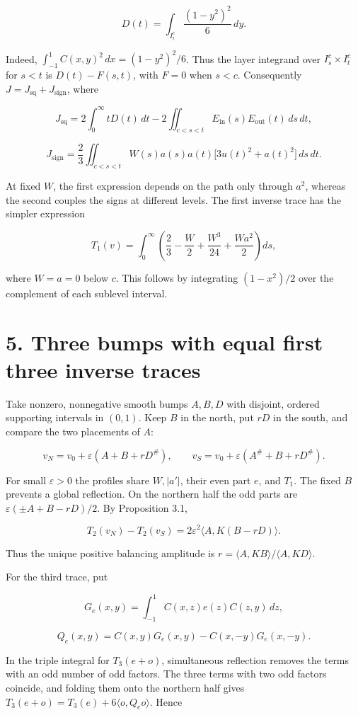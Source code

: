 \documentclass[11pt,letterpaper]{article}
\begin{document}
\[D(t)=\int_{I_t^c}\frac{(1-y^2)^2}{6}\,dy.\]

Indeed, \(\int_{-1}^1 C(x,y)^2\,dx=(1-y^2)^2/6\). Thus the layer integrand over
\(I_s^c\times I_t^c\) for \(s<t\) is \(D(t)-F(s,t)\), with \(F=0\) when \(s<c\).
Consequently \(J=J_{\mathrm{sq}}+J_{\mathrm{sign}}\), where

\[J_{\mathrm{sq}}=2\int_0^\infty tD(t)\,dt-2\iint_{c<s<t}E_{\mathrm{in}}(s)E_{\mathrm{out}}(t)\,ds\,dt,\]

\[J_{\mathrm{sign}}=\frac{2}{3}\iint_{c<s<t}W(s)a(s)a(t)\bigl[3u(t)^2+a(t)^2\bigr]\,ds\,dt.\]

At fixed \(W\), the first expression depends on the path only through \(a^2\), whereas the
second couples the signs at different levels. The first inverse trace has the simpler
expression

\[T_1(v)=\int_0^\infty\left(\frac23-\frac W2+\frac{W^3}{24}+\frac{Wa^2}{2}\right)ds,\]

where \(W=a=0\) below \(c\). This follows by integrating \((1-x^2)/2\) over the complement
of each sublevel interval.

\section{5. Three bumps with equal first three inverse
traces}\label{three-bumps-with-equal-first-three-inverse-traces}

Take nonzero, nonnegative smooth bumps \(A,B,D\) with disjoint, ordered supporting intervals
in \((0,1)\). Keep \(B\) in the north, put \(rD\) in the south, and compare the two
placements of \(A\):

\[v_N=v_0+\varepsilon(A+B+rD^\#),\qquad v_S=v_0+\varepsilon(A^\#+B+rD^\#).\]

For small \(\varepsilon>0\) the profiles share \(W,|a'|\), their even part \(e\), and
\(T_1\). The fixed \(B\) prevents a global reflection. On the northern half the odd parts
are \(\varepsilon(\pm A+B-rD)/2\). By Proposition 3.1,

\[T_2(v_N)-T_2(v_S)=2\varepsilon^2\langle A,K(B-rD)\rangle.\]

Thus the unique positive balancing amplitude is
\(r=\langle A,KB\rangle/\langle A,KD\rangle\).

For the third trace, put

\[G_e(x,y)=\int_{-1}^1 C(x,z)e(z)C(z,y)\,dz,\]

\[Q_e(x,y)=C(x,y)G_e(x,y)-C(x,-y)G_e(x,-y).\]

In the triple integral for \(T_3(e+o)\), simultaneous reflection removes the terms with an
odd number of odd factors. The three terms with two odd factors coincide, and folding them
onto the northern half gives \(T_3(e+o)=T_3(e)+6\langle o,Q_eo\rangle\). Hence
\end{document}
